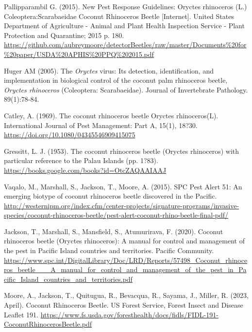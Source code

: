 \documentclass[11pt,english,letterpaper]{scrartcl}
\begin{document}
\begin{thebibliography}{1}
 Pallipparambil G. (2015). New Pest Response Guidelines: Oryctes rhinoceros (L.) Coleoptera:Scarabaeidae Coconut Rhinoceros Beetle [Internet]. United States Department of Agriculture - Animal and Plant Health Inspection Service - Plant Protection and Quarantine; 2015 p. 180.
\url{https://github.com/aubreymoore/detectorBeetles/raw/master/Documents%20for%20paper/USDA%20APHIS%20PPQ%202015.pdf}

 Huger AM (2005). The \textit{Oryctes} virus: Its detection, identification, and implementation in biological control of the coconut palm rhinoceros beetle, \textit{Oryctes rhinoceros} (Coleoptera: Scarabaeidae). Journal of Invertebrate Pathology. 89(1):78-84.

 Catley, A. (1969). The coconut rhinoceros beetle Oryctes rhinoceros(L). International Journal of Pest Management: Part A, 15(1), 18?30. \url{https://doi.org/10.1080/04345546909415075}

 Gressitt, L. J. (1953). The coconut rhinoceros beetle (Oryctes rhinoceros) with particular reference to the Palau Islands (pp. 1?83). \url{https://books.google.com/books?id=OtcZAQAAIAAJ}

 Vaqalo, M., Marshall, S., Jackson, T., Moore, A. (2015). SPC Pest Alert 51: An emerging biotype of coconut rhinoceros beetle discovered in the Pacific. \url{http://westernipm.org/index.cfm/center-projects/signature-programs/invasive-species/coconut-rhinoceros-beetle/pest-alert-coconut-rhino-beetle-final-pdf/}

 Jackson, T., Marshall, S., Mansfield, S., Atumurirava, F. (2020). Coconut rhinoceros beetle (Oryctes rhinoceros): A manual for control and management of the pest in Pacific Island countries and territories. Pacific Community. \url{https://www.spc.int/DigitalLibrary/Doc/LRD/Reports/57498_Coconut_rhinoceros_beetle___A_manual_for_control_and_management_of_the_pest_in_Pacific_Island_countries_and_territories.pdf}

 Moore, A., Jackson, T., Quitugua, R., Bevacqua, R., Sayama, J., Miller, R. (2023, April). Coconut Rhinoceros Beetle. US Forest Service, Forest Insect and Disease Leaflet 191. \url{https://www.fs.usda.gov/foresthealth/docs/fidls/FIDL-191-CoconutRhinocerosBeetle.pdf}

\end{thebibliography}
\endgroup
\end{document}
